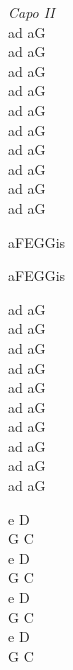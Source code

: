\begin{chord}
    \textit{Capo II}\\
    ad aG\\
    ad aG\\
    ad aG\\
    ad aG\\
    ad aG\\
    ad aG\\
    ad aG\\
    ad aG\\
    ad aG\\
    ad aG

    \hfill\break
    aFEGGis

    aFEGGis

    \hfill\break
    ad aG\\
    ad aG\\
    ad aG\\
    ad aG\\
    ad aG\\
    ad aG\\
    ad aG\\
    ad aG\\
    ad aG\\
    ad aG

    e D\\
    G C\\
    e D\\
    G C\\
    e D\\
    G C\\
    e D\\
    G C
\end{chord}